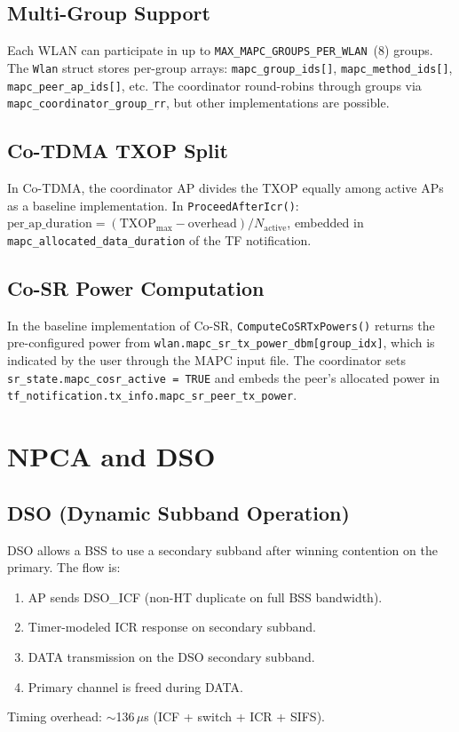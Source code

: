 \documentclass[11pt,a4paper]{article}
\begin{document}
\subsection{Multi-Group Support}

Each WLAN can participate in up to \texttt{MAX\_MAPC\_GROUPS\_PER\_WLAN}~(8) groups.  The \texttt{Wlan} struct stores per-group arrays: \texttt{mapc\_group\_ids[]}, \texttt{mapc\_method\_ids[]}, \texttt{mapc\_peer\_ap\_ids[]}, etc.  The coordinator round-robins through groups via \texttt{mapc\_coordinator\_group\_rr}, but other implementations are possible.

\subsection{Co-TDMA TXOP Split}

In Co-TDMA, the coordinator AP divides the TXOP equally among active APs as a baseline implementation. In \texttt{ProceedAfterIcr()}: $\text{per\_ap\_duration} = (\text{TXOP}_{\max} - \text{overhead}) / N_{\text{active}}$, embedded in \texttt{mapc\_allocated\_data\_duration} of the TF notification.

\subsection{Co-SR Power Computation}

In the baseline implementation of Co-SR, \texttt{ComputeCoSRTxPowers()} returns the pre-configured power from \texttt{wlan.mapc\_sr\_tx\_power\_dbm[group\_idx]}, which is indicated by the user through the MAPC input file. The coordinator sets \texttt{sr\_state.mapc\_cosr\_active = TRUE} and embeds the peer's allocated power in \texttt{tf\_notification.tx\_info.mapc\_sr\_peer\_tx\_power}.

\section{NPCA and DSO}
\label{sec:npca}

\subsection{DSO (Dynamic Subband Operation)}

DSO allows a BSS to use a secondary subband after winning contention on the primary.  The flow is:
\begin{enumerate}[nosep]
  \item AP sends DSO\_ICF (non-HT duplicate on full BSS bandwidth).
  \item Timer-modeled ICR response on secondary subband.
  \item DATA transmission on the DSO secondary subband.
  \item Primary channel is freed during DATA.
\end{enumerate}
Timing overhead: $\sim$136\,$\mu$s (ICF + switch + ICR + SIFS).
\end{document}
